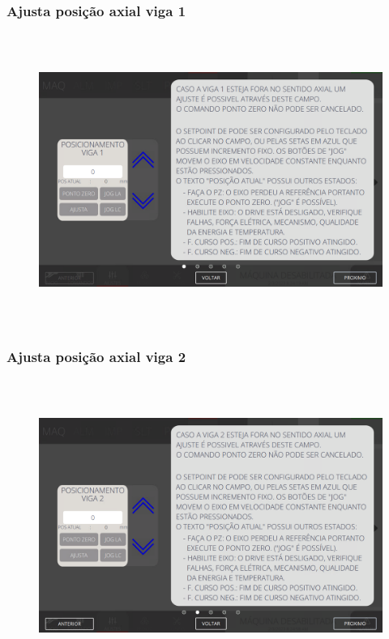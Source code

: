 \subsubsection{\small{Ajusta posição axial viga 1}}\label{miniTelaAjustesDobraAjustaPosicaoAxialViga1}
\vspace*{\fill}
\begin{figure}[h]
  \centering
  \includegraphics[width=576px,height=360px]{src/imagesFlexo/07-fold/settings/e-1.png}
\end{figure}
\vspace*{\fill}

\newpage
\thispagestyle{fancy}
\vspace*{40 pt}
\subsubsection{\small{Ajusta posição axial viga 2}}\label{miniTelaAjustesDobraAjustaPosicaoAxialViga2}
\vspace*{\fill}
\begin{figure}[h]
  \centering
  \includegraphics[width=576px,height=360px]{src/imagesFlexo/07-fold/settings/e-2.png}
\end{figure}
\vspace*{\fill}

